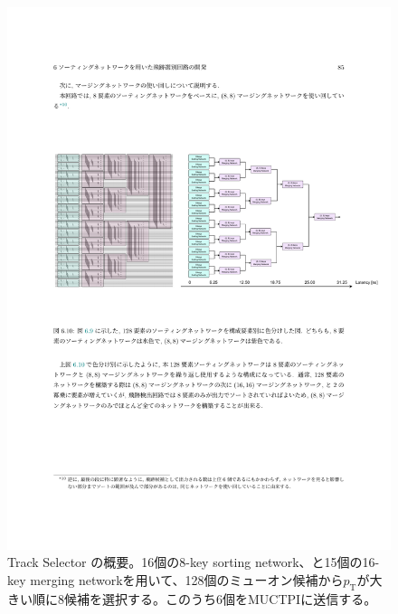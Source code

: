 \begin{figure} 
    \centering
    \includegraphics[width=16cm]{fig/SL/TrackSelector_overview.pdf}
    \caption[Track Selector の概要]{Track Selector の概要。16個の8-key sorting network、と15個の16-key merging networkを用いて、128個のミューオン候補から$p_\mathrm{T}$が大きい順に8候補を選択する。このうち6個をMUCTPIに送信する。}
    \label{TrackSelector_overview}  
\end{figure}
    

